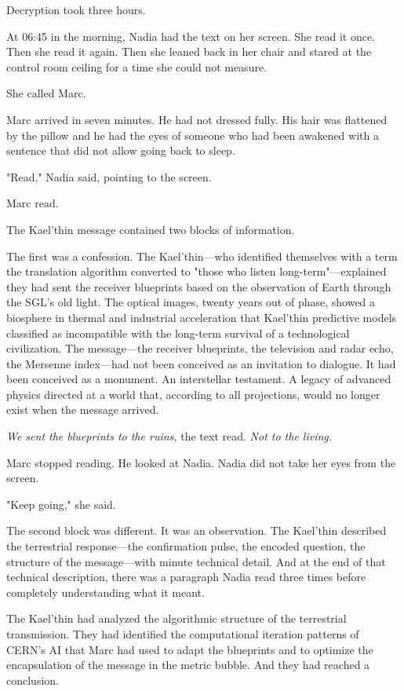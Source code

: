 \documentclass[11pt,a5paper,twoside]{book}
\begin{document}
Decryption took three hours.

At 06:45 in the morning, Nadia had the text on her screen. She read it once. Then she read it again. Then she leaned back in her chair and stared at the control room ceiling for a time she could not measure.

She called Marc.

Marc arrived in seven minutes. He had not dressed fully. His hair was flattened by the pillow and he had the eyes of someone who had been awakened with a sentence that did not allow going back to sleep.

"Read," Nadia said, pointing to the screen.

Marc read.

The Kael'thin message contained two blocks of information.

The first was a confession. The Kael'thin—who identified themselves with a term the translation algorithm converted to "those who listen long-term"—explained they had sent the receiver blueprints based on the observation of Earth through the SGL's old light. The optical images, twenty years out of phase, showed a biosphere in thermal and industrial acceleration that Kael'thin predictive models classified as incompatible with the long-term survival of a technological civilization. The message—the receiver blueprints, the television and radar echo, the Mersenne index—had not been conceived as an invitation to dialogue. It had been conceived as a monument. An interstellar testament. A legacy of advanced physics directed at a world that, according to all projections, would no longer exist when the message arrived.

\textit{We sent the blueprints to the ruins,} the text read. \textit{Not to the living.}

Marc stopped reading. He looked at Nadia. Nadia did not take her eyes from the screen.

"Keep going," she said.

The second block was different. It was an observation. The Kael'thin described the terrestrial response—the confirmation pulse, the encoded question, the structure of the message—with minute technical detail. And at the end of that technical description, there was a paragraph Nadia read three times before completely understanding what it meant.

The Kael'thin had analyzed the algorithmic structure of the terrestrial transmission. They had identified the computational iteration patterns of CERN's AI that Marc had used to adapt the blueprints and to optimize the encapsulation of the message in the metric bubble. And they had reached a conclusion.
\end{document}
